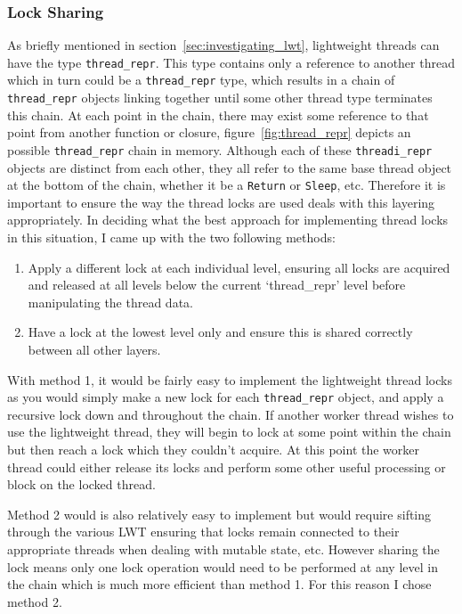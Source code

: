 \documentclass[12pt,twoside,notitlepage]{report}
\begin{document}
%
%
\subsubsection{Lock Sharing}
\label{subsubsec:lock_sharing}
As briefly mentioned in section~\ref{sec:investigating_lwt}, lightweight threads can have the type {\tt thread\_repr}. This type contains only a reference to another thread which in turn could be a {\tt thread\_repr} type, which results in a
chain of {\tt thread\_repr} objects linking together until some other thread type terminates this chain. At each point in the chain, there may exist some reference to that point from another function or closure,
figure~\ref{fig:thread_repr} depicts an possible {\tt thread\_repr} chain in memory. Although each of these {\tt threadi\_repr} objects are distinct from each other, they all refer to the same base thread object at the bottom of the
chain, whether it be a {\tt Return} or {\tt Sleep}, etc. Therefore it is important to ensure the way the thread locks are used deals with this layering appropriately. In deciding what the best approach for implementing thread locks in
this situation, I came up with the two following methods:

\begin{enumerate}
\item Apply a different lock at each individual level, ensuring all locks are acquired and released at all levels below the current `thread\_repr' level before manipulating the thread data.
\item Have a lock at the lowest level only and ensure this is shared correctly between all other layers.
\end{enumerate}

With method 1, it would be fairly easy to implement the lightweight thread locks as you would simply make a new lock for each {\tt thread\_repr} object, and apply a recursive lock down and throughout the chain. If another worker thread
wishes to use the lightweight thread, they will begin to lock at some point within the chain but then reach a lock which they couldn't acquire. At this point the worker thread could either release its locks and perform some other
useful processing or block on the locked thread.

Method 2 would is also relatively easy to implement but would require sifting through the various LWT ensuring that locks remain connected to their appropriate threads when dealing with mutable state, etc. However sharing the lock
means only one lock operation would need to be performed at any level in the chain which is much more efficient than method 1. For this reason I chose method 2.
\end{document}
